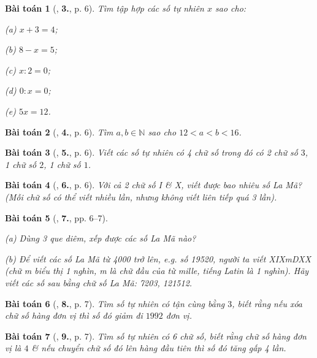 \documentclass{article}
\numberwithin{equation}{section}
\newtheorem{baitoan}{Bài toán}
\begin{document}
\begin{baitoan}[\cite{Binh_Toan_6_tap_1}, \textbf{3.}, p. 6]
	Tìm tập hợp các số tự nhiên $x$ sao cho:
	\begin{enumerate*}
		\item[(a)] $x + 3 = 4$;
		\item[(b)] $8 - x = 5$;
		\item[(c)] $x:2 = 0$;
		\item[(d)] $0:x = 0$;
		\item[(e)] $5x = 12$.
	\end{enumerate*}
\end{baitoan}

\begin{baitoan}[\cite{Binh_Toan_6_tap_1}, \textbf{4.}, p. 6]
	Tìm $a,b\in\mathbb{N}$ sao cho $12 < a < b < 16$.
\end{baitoan}

\begin{baitoan}[\cite{Binh_Toan_6_tap_1}, \textbf{5.}, p. 6]
	Viết các số tự nhiên có 4 chữ số trong đó có 2 chữ số $3$, 1 chữ số $2$, 1 chữ số $1$.
\end{baitoan}

\begin{baitoan}[\cite{Binh_Toan_6_tap_1}, \textbf{6.}, p. 6]
	Với cả 2 chữ số I \& X, viết được bao nhiêu số La Mã? (Mỗi chữ số có thể viết nhiều lần, nhưng không viết liên tiếp quá 3 lần).
\end{baitoan}

\begin{baitoan}[\cite{Binh_Toan_6_tap_1}, \textbf{7.}, pp. 6--7]
	\begin{enumerate*}
		\item[(a)] Dùng 3 que diêm, xếp được các số La Mã nào?
		\item[(b)] Để viết các số La Mã từ 4000 trở lên, e.g. số 19520, người ta viết XIXmDXX (chữ m biểu thị \emph{1 nghìn}, m là chữ đầu của từ \emph{mille}, tiếng Latin là 1 nghìn). Hãy viết các số sau bằng chữ số La Mã: 7203, 121512.
	\end{enumerate*}
\end{baitoan}

\begin{baitoan}[\cite{Binh_Toan_6_tap_1}, \textbf{8.}, p. 7]
	Tìm số tự nhiên có tận cùng bằng $3$, biết rằng nếu xóa chữ số hàng đơn vị thì số đó giảm đi $1992$ đơn vị.
\end{baitoan}

\begin{baitoan}[\cite{Binh_Toan_6_tap_1}, \textbf{9.}, p. 7]
	Tìm số tự nhiên có 6 chữ số, biết rằng chữ số hàng đơn vị là $4$ \& nếu chuyển chữ số đó lên hàng đầu tiên thì số đó tăng gấp 4 lần.
\end{baitoan}
\end{document}
